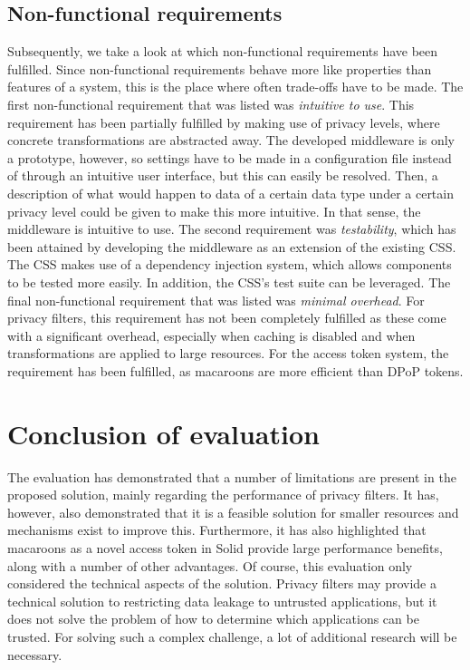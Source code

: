\subsection{Non-functional requirements}
Subsequently, we take a look at which non-functional requirements have been fulfilled. Since non-functional requirements behave more like properties than features of a system, this is the place where often trade-offs have to be made. The first non-functional requirement that was listed was \textit{intuitive to use}. This requirement has been partially fulfilled by making use of privacy levels, where concrete transformations are abstracted away. The developed middleware is only a prototype, however, so settings have to be made in a configuration file instead of through an intuitive user interface, but this can easily be resolved. Then, a description of what would happen to data of a certain data type under a certain privacy level could be given to make this more intuitive. In that sense, the middleware is intuitive to use. The second requirement was \textit{testability}, which has been attained by developing the middleware as an extension of the existing \gls{CSS}. The \gls{CSS} makes use of a dependency injection system, which allows components to be tested more easily. In addition, the \gls{CSS}'s test suite can be leveraged. The final non-functional requirement that was listed was \textit{minimal overhead}. For privacy filters, this requirement has not been completely fulfilled as these come with a significant overhead, especially when caching is disabled and when transformations are applied to large resources. For the access token system, the requirement has been fulfilled, as macaroons are more efficient than \gls{DPoP} tokens.


\section{Conclusion of evaluation}
The evaluation has demonstrated that a number of limitations are present in the proposed solution, mainly regarding the performance of privacy filters. It has, however, also demonstrated that it is a feasible solution for smaller resources and mechanisms exist to improve this. Furthermore, it has also highlighted that macaroons as a novel access token in Solid provide large performance benefits, along with a number of other advantages. Of course, this evaluation only considered the technical aspects of the solution. Privacy filters may provide a technical solution to restricting data leakage to untrusted applications, but it does not solve the problem of how to determine which applications can be trusted. For solving such a complex challenge, a lot of additional research will be necessary. 
